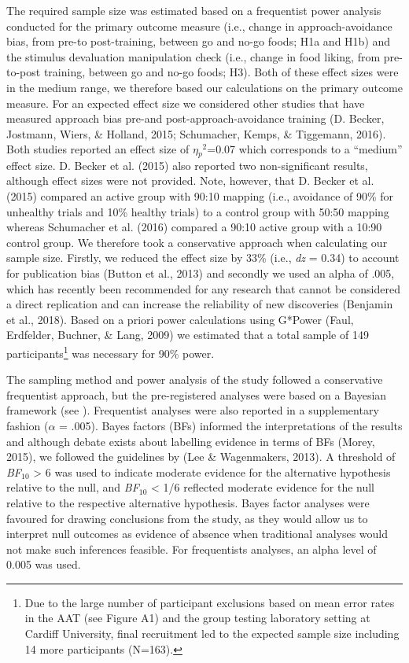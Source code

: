 \documentclass[man,floatsintext]{apa6}
\let\rmarkdownfootnote\footnote%
\def\footnote{\protect\rmarkdownfootnote}
\begin{document}
The required sample size was estimated based on a frequentist power
analysis conducted for the primary outcome measure (i.e., change in
approach-avoidance bias, from pre-to post-training, between go and no-go
foods; H1a and H1b) and the stimulus devaluation manipulation check
(i.e., change in food liking, from pre-to-post training, between go and
no-go foods; H3). Both of these effect sizes were in the medium range,
we therefore based our calculations on the primary outcome measure. For
an expected effect size we considered other studies that have measured
approach bias pre-and post-approach-avoidance training (D. Becker,
Jostmann, Wiers, \& Holland, 2015; Schumacher, Kemps, \& Tiggemann,
2016). Both studies reported an effect size of
\textit{$\eta$$_{p}$$^{2}$}=0.07 which corresponds to a \enquote{medium}
effect size. D. Becker et al. (2015) also reported two non-significant
results, although effect sizes were not provided. Note, however, that D.
Becker et al. (2015) compared an active group with 90:10 mapping (i.e.,
avoidance of 90\% for unhealthy trials and 10\% healthy trials) to a
control group with 50:50 mapping whereas Schumacher et al. (2016)
compared a 90:10 active group with a 10:90 control group. We therefore
took a conservative approach when calculating our sample size. Firstly,
we reduced the effect size by 33\% (i.e., \emph{dz} = 0.34) to account
for publication bias (Button et al., 2013) and secondly we used an alpha
of .005, which has recently been recommended for any research that
cannot be considered a direct replication and can increase the
reliability of new discoveries (Benjamin et al., 2018). Based on a
priori power calculations using G*Power (Faul, Erdfelder, Buchner, \&
Lang, 2009) we estimated that a total sample of 149
participants\footnote{Due to the large number of participant exclusions based on mean error rates in the AAT (see Figure A1) and the group testing laboratory setting at Cardiff University, final recruitment led to the expected sample size including 14 more participants (N=163).}
was necessary for 90\% power.

\par  

The sampling method and power analysis of the study followed a
conservative frequentist approach, but the pre-registered analyses were
based on a Bayesian framework (see \textit{}).
Frequentist analyses were also reported in a supplementary fashion
(\(\alpha\) = .005). Bayes factors (BFs) informed the interpretations of
the results and although debate exists about labelling evidence in terms
of BFs (Morey, 2015), we followed the guidelines by (Lee \& Wagenmakers,
2013). A threshold of \emph{BF}\(_{10}\) \textgreater{} 6 was used to
indicate moderate evidence for the alternative hypothesis relative to
the null, and \emph{BF}\(_{10}\) \textless{} 1/6 reflected moderate
evidence for the null relative to the respective alternative hypothesis.
Bayes factor analyses were favoured for drawing conclusions from the
study, as they would allow us to interpret null outcomes as evidence of
absence when traditional analyses would not make such inferences
feasible. For frequentists analyses, an alpha level of 0.005 was used.
\end{document}
